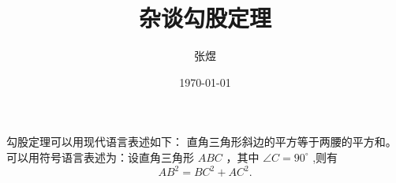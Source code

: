 \documentclass{ctexart} %
\title{\heiti 杂谈勾股定理}
\author{\kaishu 张煜}
\date{\today}
\newcommand\degree{^\circ}
\begin{document}
    \maketitle

    勾股定理可以用现代语言表述如下：
    直角三角形斜边的平方等于两腰的平方和。
    可以用符号语言表述为：设直角三角形 $ABC$ ，其中 $\angle C=90 \degree $ ,则有
    \begin{equation}
        AB^2=BC^2+AC^2.
    \end{equation}
\end{document}
